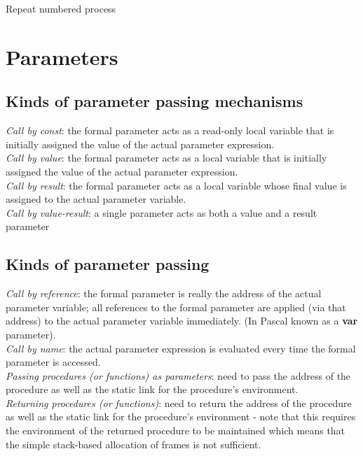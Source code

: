 \documentclass[fontsize=10pt,a4paper]{article}
\begin{document}
\begin{multicols}{3}
\begin{enumerate}
    Repeat numbered process

    \end{enumerate}

    \section{Parameters}

    \subsection{Kinds of parameter passing mechanisms}

    \textit{Call by const}: the formal parameter acts as a read-only local variable that is initially assigned the value of the actual parameter expression.\\
    \textit{Call by value}: the formal parameter acts as a local variable that is initially assigned the value of the actual parameter expression.\\
    \textit{Call by result}: the formal parameter acts as a local variable whose final value is assigned to the actual parameter variable.\\
    \textit{Call by value-result}: a single parameter acts as both a value and a result parameter

    \subsection{Kinds of parameter passing}

    \textit{Call by reference}: the formal parameter is really the address of the actual parameter variable; all references to the formal parameter are applied (via that address) to the actual parameter variable immediately. (In Pascal known as a \textbf{var} parameter).\\
    \textit{Call by name}: the actual parameter expression is evaluated every time the formal parameter is accessed.\\
    \textit{Passing procedures (or functions) as parameters}: need to pass the address of the procedure as well as the static link for the procedure’s environment.\\
    \textit{Returning procedures (or functions)}: need to return the address of the procedure as well as the static link for the procedure’s environment - note that this requires the environment of the returned procedure to be maintained which means that the simple stack-based allocation of frames is not sufficient.


\end{multicols}
\end{document}

